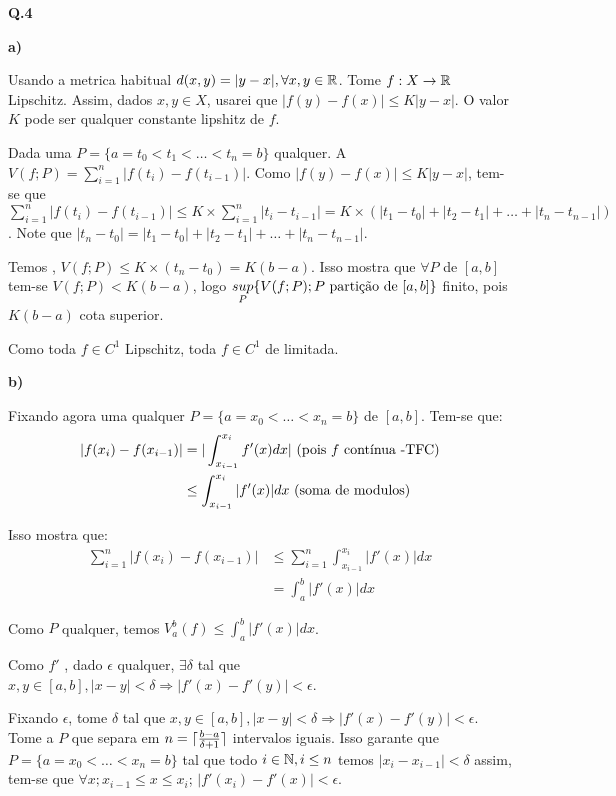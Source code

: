 \textbf{Q.4}

\textbf{a)}

Usando a metrica habitual $d(x, y) = |y-x|, \forall x,y \in \R$. Tome $f:X\rightarrow\R$ \funcao Lipschitz. Assim, dados $x,y\in X$, usarei que \mbox{$|f(y)-f(x)| \le K|y-x|$}. O valor $K$ pode ser qualquer constante lipshitz de $f$.

Dada uma \particao $P = \{a=t_0 < t_1< \ldots < t_n = b\}$ qualquer. A \variacao \eh \mbox{$V(f;P) = \sum_{i = 1}^n|f(t_i) - f(t_{i-1})|$}. Como \mbox{$|f(y)-f(x)| \le K|y-x|$}, \entao tem-se que $\sum_{i = 1}^n|f(t_i) - f(t_{i-1})| \leq K\times\sum_{i = 1}^n|t_i - t_{i-1}| = K\times(|t_1 - t_0| + |t_2 -t_1| + \ldots + |t_n - t_{n-1}|)$. Note que $|t_n - t_0| = |t_1 - t_0| + |t_2 -t_1| + \ldots + |t_n - t_{n-1}|$.

Temos \entao, $V(f;P) \leq K\times (t_n - t_0) = K(b-a)$. Isso mostra que $\forall P$ \particao de $[a,b]$ tem-se $V(f;P) <  K(b-a)$, logo $\underset{P}{sup}\{V(f;P); P \text{ \particao de }[a,b]\}$ \eh finito, pois $ K(b-a)$ \eh cota superior.

Como toda $f \in C^1$ \eh Lipschitz, \entao toda $f\in C^1$ \eh de \variacao limitada.

\textbf{b)}

Fixando agora uma \particao qualquer $P = \{a=x_0 < \ldots < x_n = b\}$ de $[a,b]$. Tem-se que:
\begin{align*}
	|f(x_i) - f(x_{i-1})| &= |\int_{x_{i-1}}^{x_i} f'(x)dx| \text{ (pois $f$ \continua -TFC}) \\
	&\leq \int_{x_{i-1}}^{x_i} |f'(x)|dx \text{ (soma de modulos)}
\end{align*}

Isso mostra que:
\begin{align*}
	\sum_{i=1}^n |f(x_i) - f(x_{i-1})| &\leq \sum_{i=1}^n \int_{x_{i-1}}^{x_i}|f'(x)|dx \\
	&= \int_{a}^{b}|f'(x)|dx
\end{align*}

Como $P$ qualquer, temos $V_a^b (f) \leq \int_{a}^{b}|f'(x)|dx$.

Como $f'$ \eh \continua, dado $\epsilon$ qualquer, $\exists \delta$ tal que $x,y \in [a,b], |x-y| < \delta \Rightarrow |f'(x) - f'(y)| < \epsilon$.

Fixando $\epsilon$, tome $\delta$ tal que $x,y \in [a,b], |x-y| < \delta \Rightarrow |f'(x) - f'(y)| < \epsilon$. Tome \tambem a \particao $P$ que separa em $n = \ceil{\frac{b-a}{\delta + 1}}$ intervalos iguais. Isso garante que $P = \{a=x_0<\ldots<x_n=b\}$ \eh tal que todo \mbox{$i\in\N,i\leq n$} temos $|x_i - x_{i-1}| < \delta$ assim, tem-se que $\forall x; x_{i-1} \leq x \leq x_i$; $|f'(x_i) - f'(x)| < \epsilon$.

